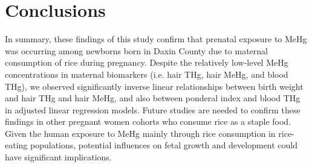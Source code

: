\section{Conclusions}

In summary, these findings of this study confirm that prenatal exposure to MeHg was occurring among newborns born in Daxin County due to maternal consumption of rice during pregnancy. Despite the relatively low-level MeHg concentrations in maternal biomarkers (i.e. hair THg, hair MeHg, and blood THg), we observed significantly inverse linear relationships between birth weight and hair THg and hair MeHg, and also between ponderal index and blood THg in adjusted linear regression models. Future studies are needed to confirm these findings in other pregnant women cohorts who consume rice as a staple food. Given the human exposure to MeHg mainly through rice consumption in rice-eating populations, potential influences on fetal growth and development could have significant implications.














